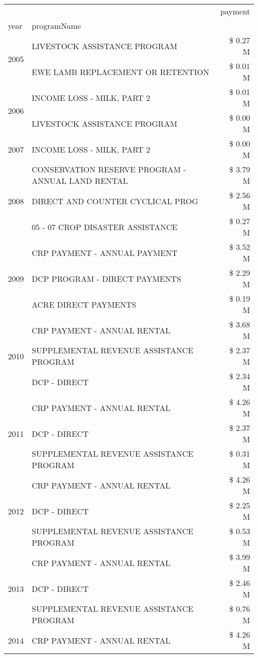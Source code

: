 \begin{tabular}{llr}
\toprule
 &  & payment \\
year & programName &  \\
\midrule
\multirow[t]{2}{*}{2005} & LIVESTOCK ASSISTANCE PROGRAM & \$ 0.27 M \\
 & EWE LAMB REPLACEMENT OR RETENTION & \$ 0.01 M \\
\cline{1-3}
\multirow[t]{2}{*}{2006} & INCOME LOSS - MILK, PART 2 & \$ 0.01 M \\
 & LIVESTOCK ASSISTANCE PROGRAM & \$ 0.00 M \\
\cline{1-3}
2007 & INCOME LOSS - MILK, PART 2 & \$ 0.00 M \\
\cline{1-3}
\multirow[t]{3}{*}{2008} & CONSERVATION RESERVE PROGRAM - ANNUAL LAND RENTAL & \$ 3.79 M \\
 & DIRECT AND COUNTER CYCLICAL PROG & \$ 2.56 M \\
 & 05 - 07 CROP DISASTER ASSISTANCE & \$ 0.27 M \\
\cline{1-3}
\multirow[t]{3}{*}{2009} & CRP PAYMENT - ANNUAL PAYMENT & \$ 3.52 M \\
 & DCP PROGRAM - DIRECT PAYMENTS & \$ 2.29 M \\
 & ACRE DIRECT PAYMENTS & \$ 0.19 M \\
\cline{1-3}
\multirow[t]{3}{*}{2010} & CRP PAYMENT - ANNUAL RENTAL & \$ 3.68 M \\
 & SUPPLEMENTAL REVENUE ASSISTANCE PROGRAM & \$ 2.37 M \\
 & DCP - DIRECT & \$ 2.34 M \\
\cline{1-3}
\multirow[t]{3}{*}{2011} & CRP PAYMENT - ANNUAL RENTAL & \$ 4.26 M \\
 & DCP - DIRECT & \$ 2.37 M \\
 & SUPPLEMENTAL REVENUE ASSISTANCE PROGRAM & \$ 0.31 M \\
\cline{1-3}
\multirow[t]{3}{*}{2012} & CRP PAYMENT - ANNUAL RENTAL & \$ 4.26 M \\
 & DCP - DIRECT & \$ 2.25 M \\
 & SUPPLEMENTAL REVENUE ASSISTANCE PROGRAM & \$ 0.53 M \\
\cline{1-3}
\multirow[t]{3}{*}{2013} & CRP PAYMENT - ANNUAL RENTAL & \$ 3.99 M \\
 & DCP - DIRECT & \$ 2.46 M \\
 & SUPPLEMENTAL REVENUE ASSISTANCE PROGRAM & \$ 0.76 M \\
\cline{1-3}
\multirow[t]{3}{*}{2014} & CRP PAYMENT - ANNUAL RENTAL & \$ 4.26 M \\

\end{tabular}
